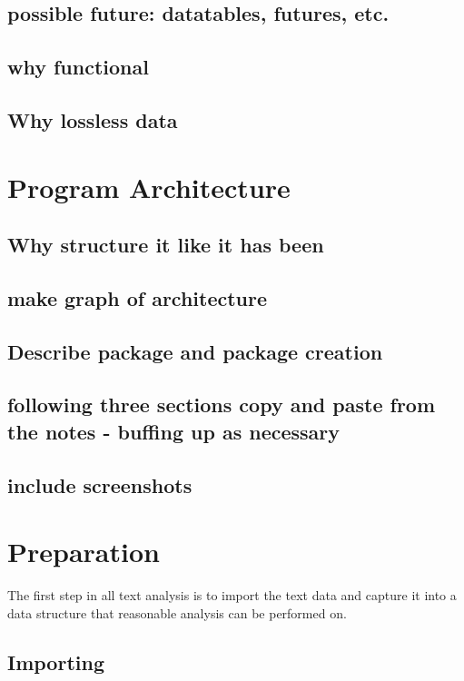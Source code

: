 \documentclass[11pt, a4paper, oneside]{report}
\begin{document}
\subsection{possible future: datatables, futures, etc.}
\subsection{why functional}
\subsection{Why lossless data}

\section{Program Architecture}
\label{sec:program-architecture-1}

\subsection{Why structure it like it has been}
\subsection{make graph of architecture}
\subsection{Describe package and package creation}
\subsection{following three sections copy and paste from the notes - buffing up as necessary}
\subsection{include screenshots}

\section{Preparation}
\label{sec:import}
The first step in all text analysis is to import the text data and
capture it into a data structure that reasonable analysis can be
performed on.

\subsection{Importing}
\label{sec:importing}
\end{document}
